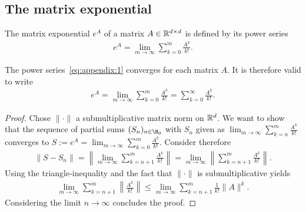 \subsection{The matrix exponential}
\label{sec:matrix-exponentials}

\begin{definition}
  The matrix exponential $e^A$ of a matrix $A\in \mathbb R^{d\times d}$ is defined
  by its power series
  \begin{gather}
    \label{eq:appendix:1}
    e^A = \lim_{m \to \infty} \sum_{k=0}^m \frac{A^k}{k!}.
  \end{gather}
\end{definition}

\begin{lemma}
  \label{lemma:appendix:exp-0}
  The power series~\eqref{eq:appendix:1} converges for each matrix $A$. It is
  therefore valid to write
  \begin{gather}
    \label{eq:appendix:1.5}
    e^A = \lim_{m \to \infty} \sum_{k=0}^m \frac{A^k}{k!}
		= \sum_{k=0}^\infty \frac{A^k}{k!}.
  \end{gather}
\end{lemma}

\begin{proof}
  Chose $\| \cdot \|$ a submultiplicative matrix norm on $\mathbb R^d$. We want to
  show that the sequence of partial sums $(S_n)_{n \in \N_0}$ with $S_n$
  given as $\lim_{m \to \infty} \sum_{k=n} ^m \frac{A^k}{k!}$ converges to
  $S := e^A = \lim_{m \to \infty} \sum_{k=0} ^m \frac{A^k}{k!}$. Consider
  therefore
  \begin{gather}
    \|S - S_n\| = \left\| \lim_{m \to \infty} \sum_{k=n+1}^m \frac{A^k}{k!} \right\|
		= \lim_{m \to \infty} \left\| \sum_{k=n+1}^m \frac{A^k}{k!} \right\|.
  \end{gather}
  Using the triangle-inequality and the fact that $\| \cdot \|$ is submultiplicative
  yields
  \begin{gather}
  	\lim_{m \to \infty} \sum_{k=n+1}^m \left\| \frac{A^k}{k!} \right\|
		\le \lim_{m \to \infty} \sum_{k=n+1}^m \frac{1}{k!} \|A \|^k.
  \end{gather}
  Considering the limit $n \to \infty$ concludes the proof.
\end{proof}

